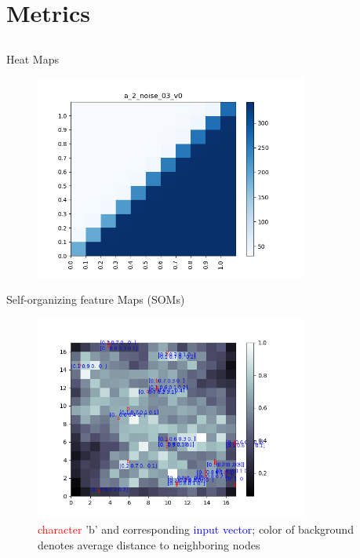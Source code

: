 \documentclass[compress]{beamer}
\begin{document}
	\section{Metrics}
	\subsection{ } %
	\begin{frame}{Heat Maps}
		\begin{figure}
			\centering
			\includegraphics[width=0.8\textwidth]{images/a_2_noise_03_v0.png}
		\end{figure}	
	\end{frame}
	\begin{frame}{Self-organizing feature Maps (SOMs)}
		\begin{figure}
			\centering
			\includegraphics[width=0.8\textwidth]{images/17x17_4d_noise_01_v0_b.png}
			\caption{\textcolor{red}{character} 'b' and corresponding \textcolor{blue}{input vector}; color of background denotes average distance to neighboring nodes}
		\end{figure}
	\end{frame}
\end{document}
